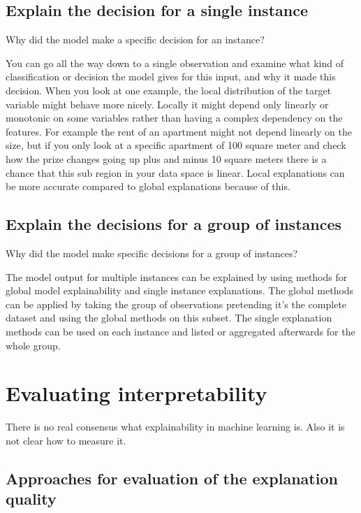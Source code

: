\documentclass[12pt,]{krantz}
\theoremstyle{definition}
\theoremstyle{definition}
\theoremstyle{definition}
\theoremstyle{remark}
\begin{document}
\subsection{Explain the decision for a single
instance}\label{explain-the-decision-for-a-single-instance}

Why did the model make a specific decision for an instance?

You can go all the way down to a single observation and examine what
kind of classification or decision the model gives for this input, and
why it made this decision. When you look at one example, the local
distribution of the target variable might behave more nicely. Locally it
might depend only linearly or monotonic on some variables rather than
having a complex dependency on the features. For example the rent of an
apartment might not depend linearly on the size, but if you only look at
a specific apartment of 100 square meter and check how the prize changes
going up plus and minus 10 square meters there is a chance that this sub
region in your data space is linear. Local explanations can be more
accurate compared to global explanations because of this.

\subsection{Explain the decisions for a group of
instances}\label{explain-the-decisions-for-a-group-of-instances}

Why did the model make specific decisions for a group of instances?

The model output for multiple instances can be explained by using
methods for global model explainability and single instance
explanations. The global methods can be applied by taking the group of
observations pretending it's the complete dataset and using the global
methods on this subset. The single explanation methods can be used on
each instance and listed or aggregated afterwards for the whole group.

\section{Evaluating interpretability}\label{evaluating-interpretability}

There is no real consensus what explainability in machine learning is.
Also it is not clear how to measure it.

\subsection{Approaches for evaluation of the explanation
quality}\label{approaches-for-evaluation-of-the-explanation-quality}
\end{document}
